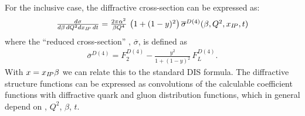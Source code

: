 For the inclusive case, the diffractive cross-section can be expressed as:
\begin{equation}
\begin{array}{lcl}
  \frac{d\sigma}{d\beta\,dQ^2dx_{{I\!P}}\,dt}
=
  \frac{2\pi\alpha^2}{\beta Q^4}\,
    \left( 1 +  (1-y)^2 \right) \overline\sigma^{D(4)}(\beta,Q^2,x_{{I\!P}},t)
\label{Dxs}
\end{array}
\end{equation}
where the ``reduced cross-section'' , $\overline\sigma$, is defined as
\begin{equation}
\begin{array}{lcl}
\overline\sigma^{D(4)}
 = F_2^{D(4)} - \frac{y^2}{1 +  (1-y)^2}\, F_L^{D(4)}.
\label{eq:sigred}
\end{array}
\end{equation}
With $x = x_{{I\!P}}\beta$ we can relate this to the standard DIS formula.
The diffractive structure functions can be expressed as convolutions of the
calculable coefficient functions with diffractive quark and gluon distribution functions,
 which in general depend on \xpom, $Q^2$, $\beta$, $t$.

